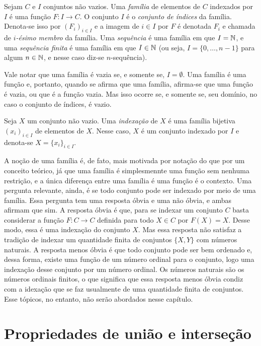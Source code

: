 \begin{definition}
Sejam $C$ e $I$ conjuntos não vazios. Uma \emph{família} de elementos de $C$ indexados por $I$ é uma função $F: I \to C$. O conjunto $I$ é o \emph{conjunto de índices} da família. Denota-se isso por $(F_i)_{i \in I}$ e a imagem de $i \in I$ por $F$ é denotada $F_i$ e chamada de \emph{$i$-ésimo membro} da família.
\noindent
Uma \emph{sequência} é uma família em que $I=\mathbb{N}$, e uma \emph{sequência finita} é uma família em que $I \in \mathbb{N}$ (ou seja, $I=\{0,\ldots,n-1\}$ para algum $n \in \mathbb{N}$, e nesse caso diz-se $n$-sequência).
\end{definition}

Vale notar que uma família é vazia se, e somente se, $I=\emptyset$. Uma família é uma função e, portanto, quando se afirma que uma família, afirma-se que uma função é vazia, ou que é a função vazia. Mas isso ocorre se, e somente se, seu domínio, no caso o conjunto de índices, é vazio.

\begin{definition}
	Seja $X$ um conjunto não vazio. Uma \emph{indexação} de $X$ é uma família bijetiva $(x_i)_{i \in I}$ de elementos de $X$. Nesse caso, $X$ é um conjunto indexado por $I$ e denota-se $X=\{x_i\}_{i \in I}$.
\end{definition}

A noção de uma família é, de fato, mais motivada por notação do que por um conceito teórico, já que uma família é simplesmennte uma função sem nenhuma restrição, e a única diferença entre uma família é uma função é o contexto. Uma pergunta relevante, ainda, é se todo conjunto pode ser indexado por meio de uma família. Essa pergunta tem uma resposta óbvia e uma não óbvia, e ambas afirmam que sim. A resposta óbvia é que, para se indexar um conjunto $C$ basta considerar a função $F: C \to C$ definida para todo $X \in C$ por $F(X)=X$. Desse modo, essa é uma indexação do conjunto $X$. Mas essa resposta não satisfaz a tradição de indexar um quantidade finita de conjuntos $\{X,Y\}$ com números naturais. A resposta menos óbvia é que todo conjunto pode ser bem ordenado e, dessa forma, existe uma função de um número ordinal para o conjunto, logo uma indexação desse conjunto por um número ordinal. Os números naturais são os números ordinais finitos, o que significa que essa resposta menos óbvia condiz com a idexação que se faz usualmente de uma quantidade finita de conjuntos. Esse tópicos, no entanto, não serão abordados nesse capítulo.

\section{Propriedades de união e interseção}

